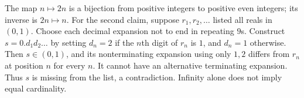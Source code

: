 The map $n\mapsto2n$ is a bijection from positive integers to positive even integers; its inverse is $2n\mapsto n$.
For the second claim, suppose $r_1,r_2,\ldots$ listed all reals in $(0,1)$. Choose each decimal expansion not to end in repeating $9$s. Construct $s=0.d_1d_2\ldots$ by setting $d_n=2$ if the $n$th digit of $r_n$ is $1$, and $d_n=1$ otherwise. Then $s\in(0,1)$, and its nonterminating expansion using only $1,2$ differs from $r_n$ at position $n$ for every $n$. It cannot have an alternative terminating expansion. Thus $s$ is missing from the list, a contradiction. Infinity alone does not imply equal cardinality.
